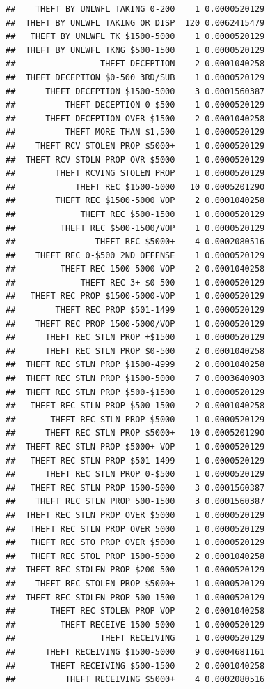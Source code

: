 \documentclass[]{book}
\begin{document}
\begin{verbatim}
##    THEFT BY UNLWFL TAKING 0-200    1 0.0000520129
##  THEFT BY UNLWFL TAKING OR DISP  120 0.0062415479
##   THEFT BY UNLWFL TK $1500-5000    1 0.0000520129
##  THEFT BY UNLWFL TKNG $500-1500    1 0.0000520129
##                 THEFT DECEPTION    2 0.0001040258
##  THEFT DECEPTION $0-500 3RD/SUB    1 0.0000520129
##      THEFT DECEPTION $1500-5000    3 0.0001560387
##          THEFT DECEPTION 0-$500    1 0.0000520129
##      THEFT DECEPTION OVER $1500    2 0.0001040258
##          THEFT MORE THAN $1,500    1 0.0000520129
##    THEFT RCV STOLEN PROP $5000+    1 0.0000520129
##  THEFT RCV STOLN PROP OVR $5000    1 0.0000520129
##        THEFT RCVING STOLEN PROP    1 0.0000520129
##            THEFT REC $1500-5000   10 0.0005201290
##        THEFT REC $1500-5000 VOP    2 0.0001040258
##             THEFT REC $500-1500    1 0.0000520129
##         THEFT REC $500-1500/VOP    1 0.0000520129
##                THEFT REC $5000+    4 0.0002080516
##    THEFT REC 0-$500 2ND OFFENSE    1 0.0000520129
##         THEFT REC 1500-5000-VOP    2 0.0001040258
##             THEFT REC 3+ $0-500    1 0.0000520129
##   THEFT REC PROP $1500-5000-VOP    1 0.0000520129
##        THEFT REC PROP $501-1499    1 0.0000520129
##    THEFT REC PROP 1500-5000/VOP    1 0.0000520129
##      THEFT REC STLN PROP +$1500    1 0.0000520129
##      THEFT REC STLN PROP $0-500    2 0.0001040258
##  THEFT REC STLN PROP $1500-4999    2 0.0001040258
##  THEFT REC STLN PROP $1500-5000    7 0.0003640903
##  THEFT REC STLN PROP $500-$1500    1 0.0000520129
##   THEFT REC STLN PROP $500-1500    2 0.0001040258
##       THEFT REC STLN PROP $5000    1 0.0000520129
##      THEFT REC STLN PROP $5000+   10 0.0005201290
##  THEFT REC STLN PROP $5000+-VOP    1 0.0000520129
##   THEFT REC STLN PROP $501-1499    1 0.0000520129
##      THEFT REC STLN PROP 0-$500    1 0.0000520129
##   THEFT REC STLN PROP 1500-5000    3 0.0001560387
##    THEFT REC STLN PROP 500-1500    3 0.0001560387
##  THEFT REC STLN PROP OVER $5000    1 0.0000520129
##   THEFT REC STLN PROP OVER 5000    1 0.0000520129
##   THEFT REC STO PROP OVER $5000    1 0.0000520129
##   THEFT REC STOL PROP 1500-5000    2 0.0001040258
##  THEFT REC STOLEN PROP $200-500    1 0.0000520129
##    THEFT REC STOLEN PROP $5000+    1 0.0000520129
##  THEFT REC STOLEN PROP 500-1500    1 0.0000520129
##       THEFT REC STOLEN PROP VOP    2 0.0001040258
##         THEFT RECEIVE 1500-5000    1 0.0000520129
##                 THEFT RECEIVING    1 0.0000520129
##      THEFT RECEIVING $1500-5000    9 0.0004681161
##       THEFT RECEIVING $500-1500    2 0.0001040258
##          THEFT RECEIVING $5000+    4 0.0002080516

\end{verbatim}
\end{document}

